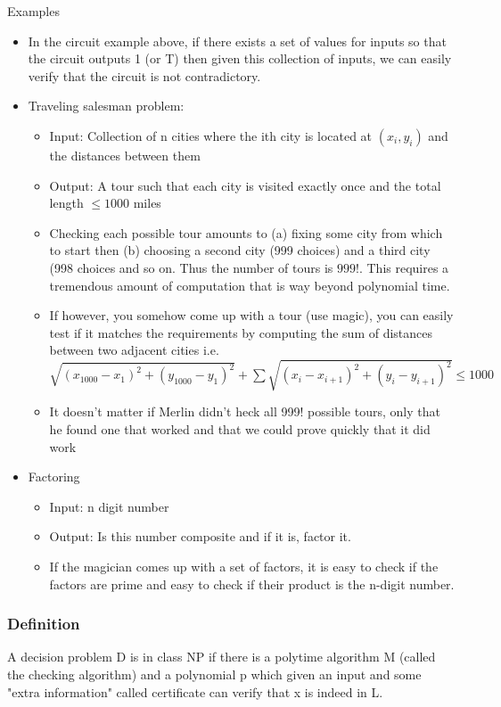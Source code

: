 \documentclass[9pt, letterpaper, oneside]{article}
\begin{document}
Examples
\begin{itemize}
	\item In the circuit example above, if there exists a set of values for inputs so that the circuit outputs 1 (or T) then given this collection of inputs, we can easily verify that the circuit is not contradictory. 
	\item Traveling salesman problem:
		\begin{itemize}
			\item Input: Collection of n cities where the ith city is located at $(x_i, y_i)$ and the distances between them
			\item Output: A tour such that each city is visited exactly once and the total length $\leq 1000$ miles
			\item Checking each possible tour amounts to (a) fixing some city from which to start then (b) choosing a second city (999 choices) and a third city (998 choices and so on. Thus the number of tours is $999!$. This requires a tremendous amount of computation that is way beyond polynomial time.
			\item If however, you somehow come up with a tour (use magic), you can easily test if it matches the requirements by computing the sum of distances between two adjacent cities i.e.\\ $\sqrt{(x_{1000} - x_1)^2 + (y_{1000} - y_1)^2} + \sum{\sqrt{(x_{i} - x_{i+1})^2 + (y_{i} - y_{i+1})^2}} \leq 1000$
			\item It doesn't matter if Merlin didn't heck all 999! possible tours, only that he found one that worked and that we could prove quickly that it did work
		\end{itemize}
	\item Factoring
		\begin{itemize}
			\item Input: n digit number
			\item Output: Is this number composite and if it is, factor it.
			\item If the magician comes up with a set of factors, it is easy to check if the factors are prime and easy to check if their product is the n-digit number.
		\end{itemize} 	
\end{itemize}

\subsubsection{Definition}
A decision problem D is in class NP if there is a polytime algorithm M (called the checking algorithm) and a polynomial p which given an input and some "extra information" called certificate can verify that x is indeed in L.
\end{document}
